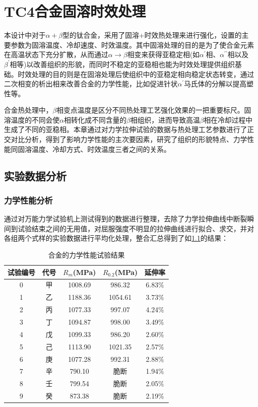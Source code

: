 \chapter{TC4合金固溶时效处理}

本设计中对于$\alpha+\beta$型的\ti 钛合金，采用了固溶+时效热处理来进行强化，设置的主要参数为固溶温度、冷却速度、时效温度\cite{mirror1,ranxingGurongwenduduiTi6Al4VELItaihejinxianweizuzhijixingnengdeyingxiang2021}。其中固溶处理的目的是为了使合金元素在高温状态下充分扩散，从而通过$\alpha \to \beta$相变来获得亚稳定相(如$\alpha^{\prime}$相、$\alpha^{\prime\prime}$相以及$\beta^{\prime}$相等)以改善组织的形貌，而同时不稳定的亚稳相也能为时效处理提供组织基础。时效处理的目的则是在固溶处理后使组织中的亚稳定相向稳定状态转变，通过二次相变的析出相来改善合金的力学性能，比如促进针状$\alpha^\prime$马氏体的分解以提高塑性等。

\ti 合金热处理中，$\beta$相变点温度是区分不同热处理工艺强化效果的一把重要标尺。固溶温度的不同会使$\alpha$相转化成不同含量的$\beta$相组织，进而导致高温$\beta$相在冷却过程中生成了不同的亚稳相。本章通过对力学拉伸试验的数据与热处理工艺参数进行了正交对比分析，得到了影响力学性能的主次要因素，研究了组织的形貌特点、力学性能同固溶温度、冷却方式、时效温度三者之间的关系。
\section{实验数据分析}
\subsection{力学性能分析}
通过对万能力学试验机上测试得到的数据进行整理，去除了力学拉伸曲线中断裂瞬间到试验结束之间的无用值，对屈服强度不明显的拉伸曲线进行拟合、求交，并对各组两个式样的实验数据进行平均化处理，整合汇总得到了如\ref{sec:mystrength}的结果：%
\begin{table}[htbp]
	\centering
	\caption{\ti 合金的力学性能试验结果}
	\label{sec:mystrength}
	\begin{tabular}{ccccc}
		\toprule
		试验编号& 代号&$ R_m $(MPa)&$ R_{0.2} $(MPa)&延伸率 \\
		\midrule
		0 & 甲 & 1008.69 &986.32& 6.83$\%$ \\
		1 & 乙 & 1188.36 &1054.61 &3.73$\%$ \\
		2 & 丙 & 1077.33 & 997.07&4.24$\%$ \\
		3 & 丁 & 1094.87 & 998.00&3.49$\%$ \\
		4 & 戊 & 1099.33 &986.20 &2.60$\%$ \\
		5 & 己 & 1113.90 & 1021.35&2.57$\%$ \\
		6 & 庚 & 1077.28 &992.31& 2.88$\%$ \\
		7 & 辛 & 790.10 & 脆断&1.94$\%$ \\
		8 & 壬 & 799.54 &脆断& 2.05$\%$ \\
		9 & 癸 & 873.38 & 脆断&2.19$\%$ \\
		\bottomrule
	\end{tabular}
\end{table}

